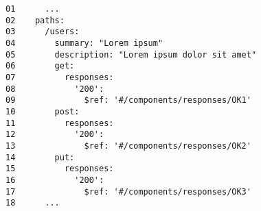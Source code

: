 \begin{figure}[t]
    \centering
        \begin{lstlisting}[style=htmlcssjs, label=lst:cleaning_data:general_path_properties, caption=Snippet of a OAS document in YAML defining the same description and summary once for all services on the /users endpoint ,captionpos=b]
01      ...
02    paths:
03      /users:
04        summary: "Lorem ipsum"
05        description: "Lorem ipsum dolor sit amet"
06        get:
07          responses:
08            '200':
09              $ref: '#/components/responses/OK1'
10        post:
11          responses:
12            '200':
13              $ref: '#/components/responses/OK2'
14        put:
15          responses:
16            '200':
17              $ref: '#/components/responses/OK3'
18      ...
        \end{lstlisting}
\end{figure}
